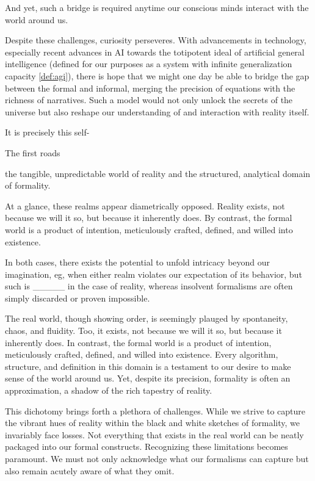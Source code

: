 And yet, such a bridge is required anytime our conscious minds interact with the world around us. 


Despite these challenges, curiosity perseveres. With advancements in technology, especially recent advances in AI towards the totipotent ideal of artificial general intelligence (defined for our purposes as a system with infinite generalization capacity \ref{def:agi}), there is hope that we might one day be able to bridge the gap between the formal and informal, merging the precision of equations with the richness of narratives. Such a model would not only unlock the secrets of the universe but also reshape our understanding of and interaction with reality itself.

It is precisely this self-





The first roads

the tangible, unpredictable world of reality and the structured, analytical domain of formality.

At a glance, these realms appear diametrically opposed. Reality exists, not because we will it so, but because it inherently does. By contrast, the formal world is a product of intention, meticulously crafted, defined, and willed into existence. 

In both cases, there exists the potential to unfold intricacy beyond our imagination, eg, when either realm violates our expectation of its behavior, but such is _____ in the case of reality, whereas insolvent formalisms are often simply discarded or proven impossible.


The real world, though showing order, is seemingly plauged by spontaneity, chaos, and fluidity. Too, it exists, not because we will it so, but because it inherently does. In contrast, the formal world is a product of intention, meticulously crafted, defined, and willed into existence. Every algorithm, structure, and definition in this domain is a testament to our desire to make sense of the world around us. Yet, despite its precision, formality is often an approximation, a shadow of the rich tapestry of reality.

This dichotomy brings forth a plethora of challenges. While we strive to capture the vibrant hues of reality within the black and white sketches of formality, we invariably face losses. Not everything that exists in the real world can be neatly packaged into our formal constructs. Recognizing these limitations becomes paramount. We must not only acknowledge what our formalisms can capture but also remain acutely aware of what they omit.

